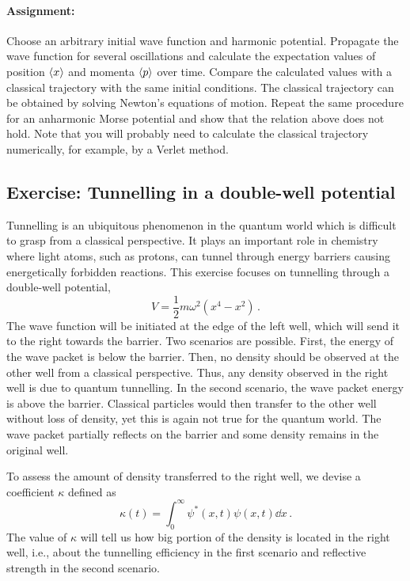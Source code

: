 \paragraph{Assignment:} Choose an arbitrary initial wave function and harmonic potential. Propagate the wave function for several oscillations and calculate the expectation values of position $\braket{x}$ and momenta $\braket{p}$ over time. Compare the calculated values with a classical trajectory with the same initial conditions. The classical trajectory can be obtained by solving Newton's equations of motion. Repeat the same procedure for an anharmonic Morse potential and show that the relation above does not hold. Note that you will probably need to calculate the classical trajectory numerically, for example, by a Verlet method.


\subsection*{Exercise: Tunnelling in a double-well potential}

Tunnelling is an ubiquitous phenomenon in the quantum world which is difficult to grasp from a classical perspective. It plays an important role in chemistry where light atoms, such as protons, can tunnel through energy barriers causing energetically forbidden reactions. This exercise focuses on tunnelling through a double-well potential,
\begin{equation*}
    V = \frac{1}{2}m\omega^2(x^4 - x^2) \, .
\end{equation*}
The wave function will be initiated at the edge of the left well, which will send it to the right towards the barrier. Two scenarios are possible. First, the energy of the wave packet is below the barrier. Then, no density should be observed at the other well from a classical perspective. Thus, any density observed in the right well is due to quantum tunnelling. In the second scenario, the wave packet energy is above the barrier. Classical particles would then transfer to the other well without loss of density, yet this is again not true for the quantum world. The wave packet partially reflects on the barrier and some density remains in the original well.

To assess the amount of density transferred to the right well, we devise a coefficient $\kappa$ defined as
\begin{equation*}
    \kappa(t) = \int_0^{\infty} \psi^*(x,t) \psi(x,t) \dd x \,.
\end{equation*}
The value of $\kappa$ will tell us how big portion of the density is located in the right well, i.e., about the tunnelling efficiency in the first scenario and reflective strength in the second scenario.

